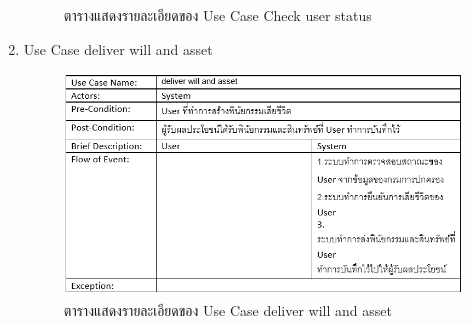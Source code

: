 \documentclass[12pt,oneside,openright,a4paper]{cpe-thai-project}
\begin{document}
\begin{enumerate}[label=\thesubsection.\arabic*,leftmargin=0pt,itemindent=2.5cm]
\begin{figure}[!thb]
		\caption{ตารางแสดงรายละเอียดของ Use Case Check user status}
	\end{figure}
	\FloatBarrier
\item Use Case deliver will and asset
	\begin{figure}[!thb]
		\centering
		\includegraphics[scale=0.8]{deliverWillAndAsset}
		\caption{ตารางแสดงรายละเอียดของ Use Case deliver will and asset}
	\end{figure}
	\FloatBarrier
\end{enumerate}
\end{document}
